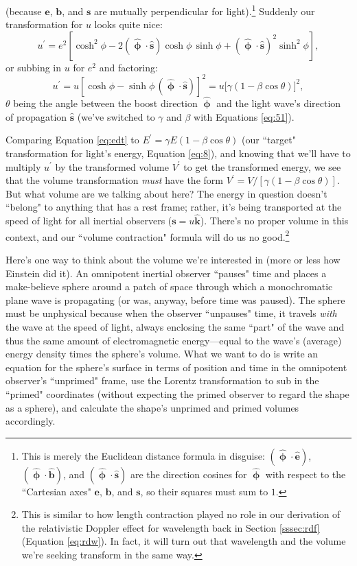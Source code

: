 \documentclass[12pt]{article}
\renewcommand{\vv}[1]{\mathbf{#1}}
\newcommand{\hatphi}{\bm{\hat{\upphi}}}
\begin{document}
(because $\vv e$, $\vv b$, and $\vv s$ are mutually perpendicular for light).\footnote{This is merely the Euclidean distance formula in disguise: $(\hatphi \cdot \vv{\hat e})$, $(\hatphi \cdot \vv{\hat b})$, and $( \hatphi \cdot \vv{\hat s} )$ are the direction cosines for $\hatphi$ with respect to the ``Cartesian axes" $\vv e$, $\vv b$, and $\vv s$, so their squares must sum to $1$.} Suddenly our transformation for $u$ looks quite nice:
\begin{equation*}
u^\prime = e^2 \left[ \cosh^2{\phi} - 2 ( \hatphi \cdot \vv{\hat s}) \cosh{\phi} \, \sinh{\phi} + ( \hatphi \cdot \vv{\hat s} )^2 \sinh^2{\phi} \right] ,
\end{equation*}
or subbing in $u$ for $e^2$ and factoring:
\begin{equation}\label{eq:edt}
u^\prime = u \left[ \cosh{\phi} - \sinh{\phi} \, ( \hatphi \cdot \vv{\hat s}) \right]^2 = u  \big[ \gamma ( 1 - \beta \cos{\theta} ) \big]^2,
\end{equation}
$\theta$ being the angle between the boost direction $\hatphi$ and the light wave's direction of propagation $\vv{\hat s}$ (we've switched to $\gamma$ and $\beta$ with Equations \ref{eq:51}).

Comparing Equation \ref{eq:edt} to ${E^\prime = \gamma E (1 - \beta \cos{\theta})}$ (our ``target" transformation for light's energy, Equation \ref{eq:8}), and knowing that we'll have to multiply $u^\prime$ by the transformed volume $V^\prime$ to get the transformed energy, we see that the volume transformation \emph{must} have the form $V^\prime = V / [\gamma( 1 - \beta \cos{\theta} )]$. But what volume are we talking about here? The energy in question doesn't ``belong" to anything that has a rest frame; rather, it's being transported at the speed of light for all inertial observers ($\vv s = u \vv{\hat{k}}$). There's no proper volume in this context, and our ``volume contraction" formula will do us no good.\footnote{This is similar to how length contraction played no role in our derivation of the relativistic Doppler effect for wavelength back in Section \ref{sssec:rdf} (Equation \ref{eq:rdw}). In fact, it will turn out that wavelength and the volume we're seeking transform in the same way.}

Here's one way to think about the volume we're interested in (more or less how Einstein did it). An omnipotent inertial observer ``pauses" time and places a make-believe sphere around a patch of space through which a monochromatic plane wave is propagating (or was, anyway, before time was paused). The sphere must be unphysical because when the observer ``unpauses" time, it travels \emph{with} the wave at the speed of light, always enclosing the same ``part" of the wave and thus the same amount of electromagnetic energy---equal to the wave's (average) energy density times the sphere's volume. What we want to do is write an equation for the sphere's surface in terms of position and time in the omnipotent observer's ``unprimed" frame, use the Lorentz transformation to sub in the ``primed" coordinates (without expecting the primed observer to regard the shape as a sphere), and calculate the shape's unprimed and primed volumes accordingly.
\end{document}
